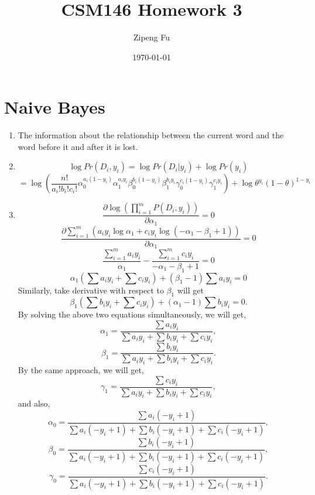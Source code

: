 \documentclass[11pt]{article}
\title{\textbf{CSM146 Homework 3}}
\author{Zipeng Fu}
\date{\today}
\begin{document}
\maketitle
\newpage 

\section{Naive Bayes}
\begin{enumerate}[label=(\alph*)]
\item 
    The information about the relationship between the current word and the word before it and after it is lost.
\item
    $$\log{Pr(D_i,y_i)} = \log{Pr(D_i|y_i)}+\log{Pr(y_i)}$$
    $$ = \log\left({\frac{n!}{a_i!b_i!c_i!}\alpha_0^{a_i(1-y_i)}\alpha_1^{a_iy_i}\beta_0^{b_i(1-y_i)}\beta_1^{b_iy_i}\gamma_0^{c_i(1-y_i)}\gamma_1^{c_iy_i}}\right) + \log{\theta^{y_i}(1-\theta)^{1-y_i}}$$
\item 
    $$\frac{\partial{\log{\left(\prod_{i=1}^m{P(D_i,y_i)}\right)}}}{\partial{\alpha_1}} = 0$$
    $$\frac{\partial{\sum_{i=1}^m{\left(a_iy_i\log{\alpha_1}+c_iy_i\log({-\alpha_1-\beta_1+1})\right)}}}{\partial{\alpha_1}} = 0$$
    $$\frac{\sum_{i=1}^m{a_iy_i}}{\alpha_1} - \frac{\sum_{i=1}^m{c_iy_i}}{-\alpha_1-\beta_1+1} = 0$$
    $$\alpha_1(\sum{a_iy_i}+\sum{c_iy_i}) + (\beta_1 - 1)\sum{a_iy_i} = 0$$
    Similarly, take derivative with respect to $\beta_1$ will get
    $$\beta_1(\sum{b_iy_i}+\sum{c_iy_i}) + (\alpha_1 - 1)\sum{b_iy_i} = 0.$$
    By solving the above two equations simultaneously, we will get, 
    $$\alpha_1 = \frac{\sum{a_iy_i}}{\sum{a_iy_i}+\sum{b_iy_i}+\sum{c_iy_i}},$$
    $$\beta_1 = \frac{\sum{b_iy_i}}{\sum{a_iy_i}+\sum{b_iy_i}+\sum{c_iy_i}}.$$
    By the same approach, we will get, 
    $$\gamma_1 = \frac{\sum{c_iy_i}}{\sum{a_iy_i}+\sum{b_iy_i}+\sum{c_iy_i}},$$
    and also, 
    $$\alpha_0 = \frac{\sum{a_i(-y_i+1)}}{\sum{a_i(-y_i+1)}+\sum{b_i(-y_i+1)}+\sum{c_i(-y_i+1)}},$$
    $$\beta_0 = \frac{\sum{b_i(-y_i+1)}}{\sum{a_i(-y_i+1)}+\sum{b_i(-y_i+1)}+\sum{c_i(-y_i+1)}},$$
    $$\gamma_0 = \frac{\sum{c_i(-y_i+1)}}{\sum{a_i(-y_i+1)}+\sum{b_i(-y_i+1)}+\sum{c_i(-y_i+1)}}.$$
\end{enumerate}
\end{document}

